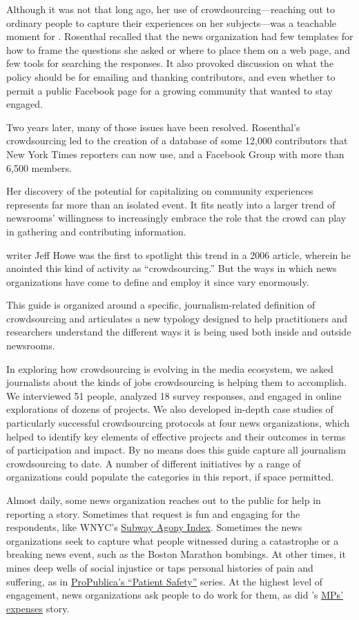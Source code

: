 \begin{itemize}
Although it was not that long ago, her use of crowdsourcing---reaching out to ordinary people to capture their experiences on her subjects---was a teachable moment for . Rosenthal recalled that the news organization had few templates for how to frame the questions she asked or where to place them on a web page, and few tools for searching the responses. It also provoked discussion on what the policy should be for emailing and thanking contributors, and even whether to permit a public Facebook page for a growing community that wanted to stay engaged. 

Two years later, many of those issues have been resolved. Rosenthal’s crowdsourcing led to the creation of a database of some 12,000 contributors that New York Times reporters can now use, and a Facebook Group with more than 6,500 members.

Her discovery of the potential for capitalizing on community experiences represents far more than an isolated event. It fits neatly into a larger trend of newsrooms’ willingness to increasingly embrace the role that the crowd can play in gathering and contributing information.

 writer Jeff Howe was the first to spotlight this trend in a 2006 article, wherein he anointed this kind of activity as ``crowdsourcing.''\autocite{Howe} But the ways in which news organizations have come to define and employ it since vary enormously. 

This guide is organized around a specific, journalism-related definition of crowdsourcing and articulates a new typology designed to help practitioners and researchers understand the different ways it is being used both inside and outside newsrooms. 

In exploring how crowdsourcing is evolving in the media ecosystem, we asked journalists about the kinds of jobs crowdsourcing is helping them to accomplish. We interviewed 51 people, analyzed 18 survey responses, and engaged in online explorations of dozens of projects. We also developed in-depth case studies of particularly successful crowdsourcing protocols at four news organizations, which helped to identify key elements of effective projects and their outcomes in terms of participation and impact.
By no means does this guide capture all journalism crowdsourcing to date. A number of different initiatives by a range of organizations could populate the categories in this report, if space permitted.

Almost daily, some news organization reaches out to the public for help in reporting a story. Sometimes that request is fun and engaging for the respondents, like WNYC’s \underline{Subway Agony Index}.\autocite{SubwayAgony} Sometimes the news organizations seek to capture what people witnessed during a catastrophe or a breaking news event, such as the Boston Marathon bombings. At other times, it mines deep wells of social injustice or taps personal histories of pain and suffering, as in \underline{ProPublica’s ``Patient Safety''} series.\autocite{Safety} At the highest level of engagement, news organizations ask people to do work for them, as did ’s \underline{MPs’ expenses} story.\autocite{MPExpense}


\end{itemize}
